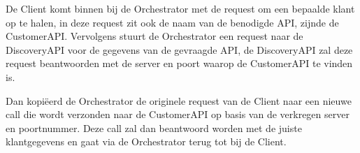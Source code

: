  De Client komt binnen bij de Orchestrator met de request om een bepaalde klant op te halen, in deze request zit ook de naam van de benodigde API, zijnde de CustomerAPI. Vervolgens stuurt de Orchestrator een request naar de DiscoveryAPI voor de gegevens van de gevraagde API, de DiscoveryAPI zal deze request beantwoorden met de server en poort waarop de CustomerAPI te vinden is. 
 
 Dan kopiëerd de Orchestrator de originele request van de Client naar een nieuwe call die wordt verzonden naar de CustomerAPI op basis van de verkregen server en poortnummer. Deze call zal dan beantwoord worden met de juiste klantgegevens en gaat via de Orchestrator terug tot bij de Client. 
 
 







